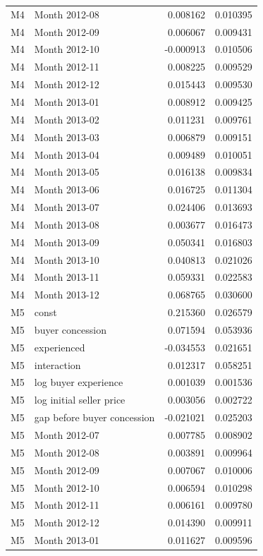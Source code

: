\documentclass[11pt,a4paper]{article}
\begin{document}
\begin{longtable}{lp{8.4cm}rr}
M4 & Month 2012-08 & 0.008162 & 0.010395 \\
M4 & Month 2012-09 & 0.006067 & 0.009431 \\
M4 & Month 2012-10 & -0.000913 & 0.010506 \\
M4 & Month 2012-11 & 0.008225 & 0.009529 \\
M4 & Month 2012-12 & 0.015443 & 0.009530 \\
M4 & Month 2013-01 & 0.008912 & 0.009425 \\
M4 & Month 2013-02 & 0.011231 & 0.009761 \\
M4 & Month 2013-03 & 0.006879 & 0.009151 \\
M4 & Month 2013-04 & 0.009489 & 0.010051 \\
M4 & Month 2013-05 & 0.016138 & 0.009834 \\
M4 & Month 2013-06 & 0.016725 & 0.011304 \\
M4 & Month 2013-07 & 0.024406 & 0.013693 \\
M4 & Month 2013-08 & 0.003677 & 0.016473 \\
M4 & Month 2013-09 & 0.050341 & 0.016803 \\
M4 & Month 2013-10 & 0.040813 & 0.021026 \\
M4 & Month 2013-11 & 0.059331 & 0.022583 \\
M4 & Month 2013-12 & 0.068765 & 0.030600 \\
M5 & const & 0.215360 & 0.026579 \\
M5 & buyer concession & 0.071594 & 0.053936 \\
M5 & experienced & -0.034553 & 0.021651 \\
M5 & interaction & 0.012317 & 0.058251 \\
M5 & log buyer experience & 0.001039 & 0.001536 \\
M5 & log initial seller price & 0.003056 & 0.002722 \\
M5 & gap before buyer concession & -0.021021 & 0.025203 \\
M5 & Month 2012-07 & 0.007785 & 0.008902 \\
M5 & Month 2012-08 & 0.003891 & 0.009964 \\
M5 & Month 2012-09 & 0.007067 & 0.010006 \\
M5 & Month 2012-10 & 0.006594 & 0.010298 \\
M5 & Month 2012-11 & 0.006161 & 0.009780 \\
M5 & Month 2012-12 & 0.014390 & 0.009911 \\
M5 & Month 2013-01 & 0.011627 & 0.009596 \\

\end{longtable}
\end{document}
